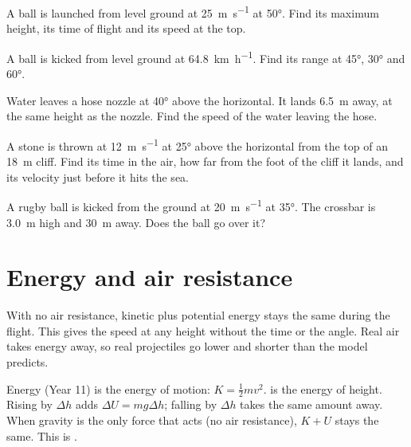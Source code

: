 \begin{quickcheck}
  \item A ball is launched from level ground at \qty{25}{m.s^{-1}} at \ang{50}. Find its
        maximum height, its time of flight and its speed at the top.
  \item A ball is kicked from level ground at \qty{64.8}{km.h^{-1}}. Find its range at
        \ang{45}, \ang{30} and \ang{60}.
  \item Water leaves a hose nozzle at \ang{40} above the horizontal. It lands \qty{6.5}{m}
        away, at the same height as the nozzle. Find the speed of the water leaving the hose.
  \item A stone is thrown at \qty{12}{m.s^{-1}} at \ang{25} above the horizontal from the top
        of an \qty{18}{m} cliff. Find its time in the air, how far from the foot of the cliff
        it lands, and its velocity just before it hits the sea.
  \item A rugby ball is kicked from the ground at \qty{20}{m.s^{-1}} at \ang{35}. The
        crossbar is \qty{3.0}{m} high and \qty{30}{m} away. Does the ball go over it?
\end{quickcheck}

\section{Energy and air resistance}\label{ch1:sec:energy}

\begin{bigidea}
With no air resistance, kinetic plus potential energy stays the same during the flight.
This gives the speed at any height without the time or the angle. Real air takes energy
away, so real projectiles go lower and shorter than the model predicts.
\end{bigidea}

\begin{keywords}
\end{keywords}

\begin{refresher}{Energy (Year 11)}
 is the energy of motion: $K = \frac{1}{2}mv^2$.  is the energy of height. Rising by $\Delta h$ adds $\Delta U = mg\Delta h$;
falling by $\Delta h$ takes the same amount away. When gravity is the only force that acts
(no air resistance), $K + U$ stays the same. This is .
\end{refresher}


